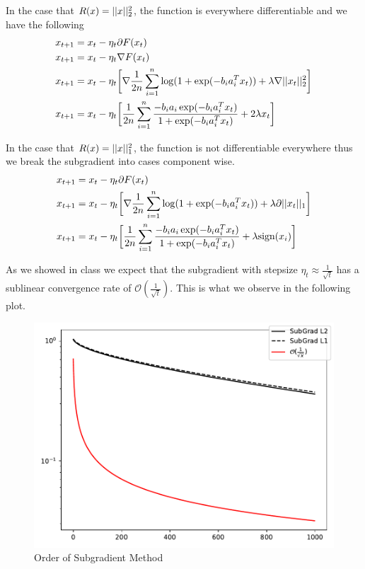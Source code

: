 \documentclass[11pt, answers]{exam}
\begin{document}
\begin{questions}
\begin{solution}
		In the case that $R(x)=|| x ||_2^2$, the function is everywhere differentiable
		and we have the following
		\begin{align*}
		x_{t+1}&=x_t-\eta_t\partial F(x_t)\\
		x_{t+1}&=x_t-\eta_t\nabla F(x_t)\\
		x_{t+1}&=x_t-\eta_t\bigg[\nabla\frac{1}{2n}\sum^n_{i=1}\log(1+\exp(-b_ia_i^Tx_t)) 
				+ \lambda\nabla || x_t ||_2^2\bigg]\\
		x_{t+1}&=x_t-\eta_t\bigg[\frac{1}{2n}\sum^n_{i=1}\frac{-b_ia_i\exp(-b_ia_i^Tx_t)}
				{1+\exp(-b_ia_i^Tx_t)} + 2 \lambda x_t\bigg]
		\end{align*}
		
		In the case that $R(x)=|| x ||_1^2$, the function is not differentiable everywhere
		thus we break the subgradient into cases component wise.
		\begin{align*}
		x_{t+1}&=x_t-\eta_t\partial F(x_t)\\
		x_{t+1}&=x_t-\eta_t\bigg[\nabla \frac{1}{2n}\sum^n_{i=1}
				\log(1+\exp(-b_ia_i^Tx_t)) +\lambda\partial || x_t ||_1\bigg]\\
		x_{t+1}&=x_t-\eta_t\bigg[\frac{1}{2n}\sum^n_{i=1}\frac{-b_ia_i\exp(-b_ia_i^Tx_t)}
				{1+\exp(-b_ia_i^Tx_t)} +\lambda \text{sign}(x_i)\bigg]
		\end{align*}
		
		As we showed in class we expect that the subgradient with stepsize $\eta_t \approx \frac{1}{\sqrt{t}}$ has a sublinear convergence rate of $\mathcal{O}(\frac{1}{\sqrt{t}})$. This is what we observe in the following plot.
		
		\begin{figure}[H]
		\centering
		\includegraphics[width=.75\textwidth]{../out/SubGrad.pdf}
		\caption{Order of Subgradient Method}
		\end{figure}
		

\end{solution}
\end{questions}
\end{document}
